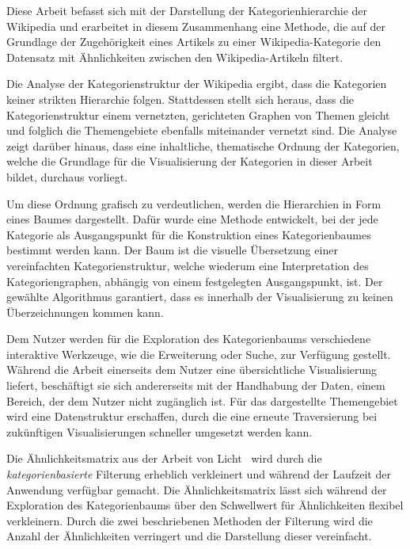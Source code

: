 
Diese Arbeit befasst sich mit der Darstellung der Kategorienhierarchie der Wikipedia und erarbeitet in diesem Zusammenhang eine Methode, die auf der Grundlage der Zugehörigkeit eines Artikels zu einer Wikipedia-Kategorie den Datensatz mit Ähnlichkeiten zwischen den Wikipedia-Artikeln filtert.

Die Analyse der Kategorienstruktur der Wikipedia ergibt, dass die Kategorien keiner strikten Hierarchie folgen.
Stattdessen stellt sich heraus, dass die Kategorienstruktur einem vernetzten, gerichteten Graphen von Themen gleicht und folglich die Themengebiete ebenfalls miteinander vernetzt sind.
Die Analyse zeigt darüber hinaus, dass eine inhaltliche, thematische Ordnung der Kategorien, welche die Grundlage für die Visualisierung der Kategorien in dieser Arbeit bildet, durchaus vorliegt.

Um diese Ordnung grafisch zu verdeutlichen, werden die Hierarchien in Form eines Baumes dargestellt.
Dafür wurde eine Methode entwickelt, bei der jede Kategorie als Ausgangspunkt für die Konstruktion eines Kategorienbaumes bestimmt werden kann.
Der Baum ist die visuelle Übersetzung einer vereinfachten Kategorienstruktur, welche wiederum eine Interpretation des Kategoriengraphen, abhängig von einem festgelegten Ausgangspunkt, ist.
Der gewählte Algorithmus garantiert, dass es innerhalb der Visualisierung zu keinen Überzeichnungen kommen kann.

Dem Nutzer werden für die Exploration des Kategorienbaums verschiedene interaktive Werkzeuge, wie die Erweiterung oder Suche, zur Verfügung gestellt. 
Während die Arbeit einerseits dem Nutzer eine übersichtliche Visualisierung liefert, beschäftigt sie sich andererseits mit der Handhabung der Daten, einem Bereich, der dem Nutzer nicht zugänglich ist.
Für das dargestellte Themengebiet wird eine Datenstruktur erschaffen, durch die eine erneute Traversierung bei zukünftigen Visualisierungen schneller umgesetzt werden kann.

Die Ähnlichkeitsmatrix aus der Arbeit von Licht~\cite{licht:2017} wird durch die \emph{kategorienbasierte} Filterung erheblich verkleinert und während der Laufzeit der Anwendung verfügbar gemacht.
Die Ähnlichkeitsmatrix lässt sich während der Exploration des Kategorienbaums über den Schwellwert für Ähnlichkeiten flexibel verkleinern.
Durch die zwei beschriebenen Methoden der Filterung wird die Anzahl der Ähnlichkeiten verringert und die Darstellung dieser vereinfacht.



